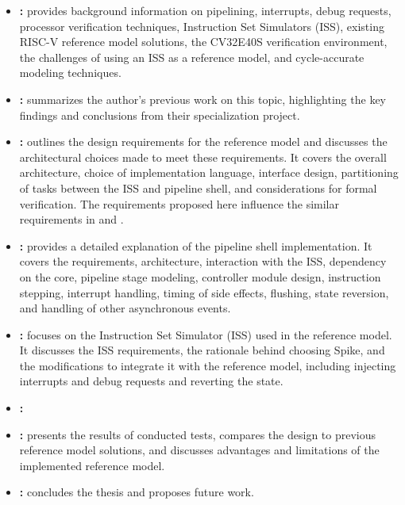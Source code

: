 \begin{itemize}
    \item \textbf{: } provides background information on pipelining, interrupts, debug requests, processor verification techniques, Instruction Set Simulators (ISS), existing RISC-V reference model solutions, the CV32E40S verification environment, the challenges of using an ISS as a reference model, and cycle-accurate modeling techniques.
    
    \item \textbf{: }  
    summarizes the author's previous work on this topic, highlighting the key findings and conclusions from their specialization project. %
    
    \item \textbf{: } 
    outlines the design requirements for the reference model and discusses the architectural choices made to meet these requirements. It covers the overall architecture, choice of implementation language, interface design, partitioning of tasks between the ISS and pipeline shell, and considerations for formal verification. The requirements proposed here influence the similar requirements in  and .
    
    \item \textbf{: }  
    provides a detailed explanation of the pipeline shell implementation. It covers the requirements, architecture, interaction with the ISS, dependency on the core, pipeline stage modeling, controller module design, instruction stepping, interrupt handling, timing of side effects, flushing, state reversion, and handling of other asynchronous events.
    
    \item \textbf{: } 
    focuses on the Instruction Set Simulator (ISS) used in the reference model. It discusses the ISS requirements, the rationale behind choosing Spike, and the modifications to integrate it with the reference model, including injecting interrupts and debug requests and reverting the state.
    
    \item \textbf{: } 
    
    
    \item \textbf{: }
    presents the results of conducted tests, compares the design to previous reference model solutions, and discusses advantages and limitations of the implemented reference model.
    
    \item \textbf{: } 
    concludes the thesis and proposes future work.
\end{itemize}

